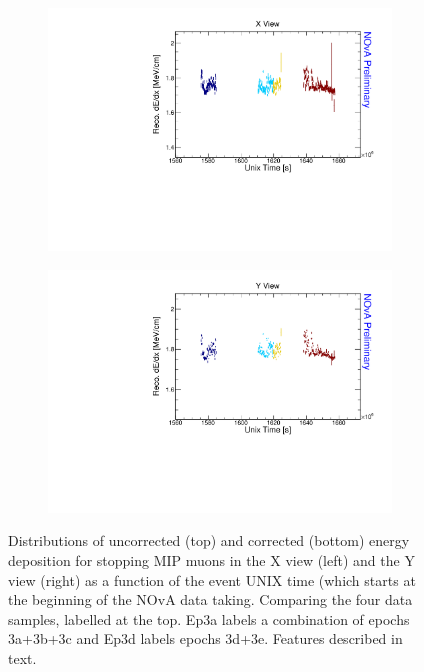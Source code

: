 \begin{figure}[!ht]
\begin{subfigure}{0.495\textwidth}
  \end{subfigure}
  \begin{subfigure}{0.495\textwidth}
    \includegraphics[width=\linewidth]{Plots/Calibana/recomevcm_time_x.pdf}
  \end{subfigure}
  \begin{subfigure}{0.495\textwidth}
    \includegraphics[width=\linewidth]{Plots/Calibana/recomevcm_time_y.pdf}
  \end{subfigure}
  \caption[Validation plots for stopping muons along time]{Distributions of uncorrected (top) and corrected (bottom) energy deposition for stopping \acrshort{MIP} muons in the X view (left) and the Y view (right) as a function of the event UNIX time (which starts at the beginning of the \acrshort{NOvA} data taking. Comparing the four data samples, labelled at the top. Ep3a labels a combination of epochs 3a+3b+3c and Ep3d labels epochs 3d+3e. Features described in text.}
  \label{fig:AbsCalibDrift1}
\end{figure}


